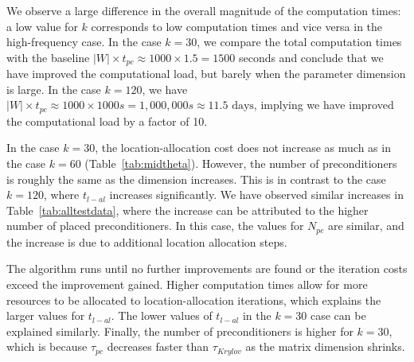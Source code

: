 We observe a large difference in the overall magnitude of the computation times: a low value for $k$ corresponds to low computation times and vice versa in the high-frequency case.
In the case $k=30$, we compare the total computation times with the baseline $|W|\times t_{pc}\approx 1000\times 1.5=1500$ seconds and conclude that we have improved the computational load, but barely when the parameter dimension is large.
In the case $k=120$, we have $|W|\times t_{pc}\approx 1000\times 1000s=1,000,000s\approx11.5\text{ days}$, implying we have improved the computational load by a factor of 10.

In the case $k=30$, the location-allocation cost does not increase as much as in the case $k=60$ (Table~\ref{tab:midtheta}).
However, the number of preconditioners is roughly the same as the dimension increases.
This is in contrast to the case $k=120$, where $t_{l-al}$ increases significantly.
We have observed similar increases in Table~\ref{tab:alltestdata}, where the increase can be attributed to the higher number of placed preconditioners.
In this case, the values for $N_{pc}$ are similar, and the increase is due to additional location allocation steps.

The algorithm runs until no further improvements are found or the iteration costs exceed the improvement gained.
Higher computation times allow for more resources to be allocated to location-allocation iterations, which explains the larger values for $t_{l-al}$.
The lower values of $t_{l-al}$ in the $k=30$ case can be explained similarly.
Finally, the number of preconditioners is higher for $k=30$, which is because $\tau_{pc}$ decreases faster than $\tau_{Krylov}$ as the matrix dimension shrinks.

